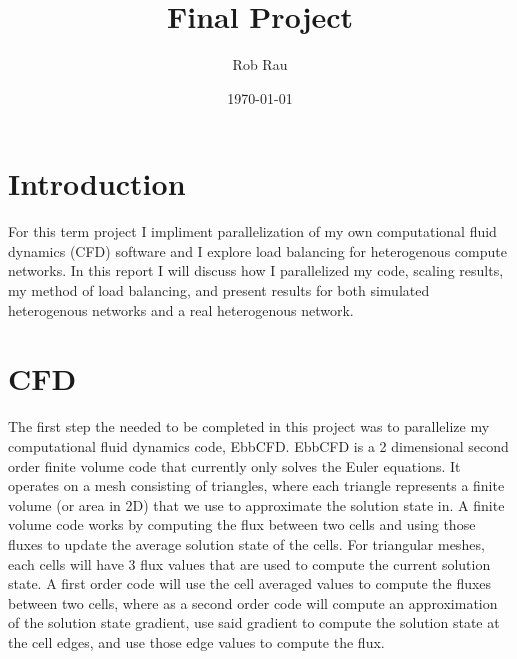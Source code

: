\documentclass[12pt,parskip=full]{article}
\numberwithin{subsection}{section}
\begin{document}
	\vspace{-4ex}
	\title{Final Project\vspace{-3.5ex}}
	\author{Rob Rau\vspace{-4ex}}
	\date{\today\vspace{-4ex}}
	\maketitle

	\section{Introduction}
		For this term project I impliment parallelization of my own computational fluid dynamics (CFD) software and I explore load balancing
		for heterogenous compute networks. In this report I will discuss how I parallelized my code, scaling results, my method of
		load balancing, and present results for both simulated heterogenous networks and a real heterogenous network. 

	\section{CFD}
		The first step the needed to be completed in this project was to parallelize my computational fluid dynamics code, EbbCFD.
		EbbCFD is a 2 dimensional second order finite volume code that currently only solves the Euler equations. It operates on a
		mesh consisting of triangles, where each triangle represents a finite volume (or area in 2D) that we use to approximate the
		solution state in. A finite volume code works by computing the flux between two cells and using those fluxes to update the
		average solution state of the cells. For triangular meshes, each cells will have 3 flux values that are used to compute the
		current solution state. A first order code will use the cell averaged values to compute the fluxes between two cells, where
		as a second order code will compute an approximation of the solution state gradient, use said gradient to compute the solution
		state at the cell edges, and use those edge values to compute the flux.
		
\end{document}

